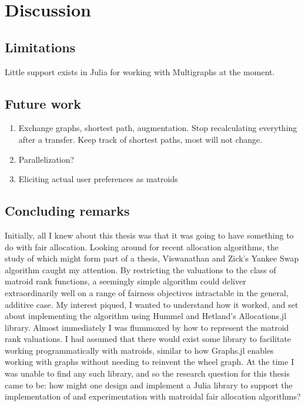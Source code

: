 \chapter{Discussion}
\label{chap:conclusions}
\skelpar

\section{Limitations}
Little support exists in Julia for working with Multigraphs at the moment.

\section{Future work}
\begin{enumerate}
  \item Exchange graphs, shortest path, augmentation. Stop recalculating everything after a transfer. Keep track of shortest paths, most will not change.
  \item Parallelization?
  \item Eliciting actual user preferences as matroids
\end{enumerate}

\section{Concluding remarks}
Initially, all I knew about this thesis was that it was going to have something to do with fair allocation. Looking around for recent allocation algorithms, the study of which might form part of a thesis, Viswanathan and Zick's Yankee Swap algorithm caught my attention. By restricting the valuations to the class of matroid rank functions, a seemingly simple algorithm could deliver extraordinarily well on a range of fairness objectives intractable in the general, additive case. My interest piqued, I wanted to understand how it worked, and set about implementing the algorithm using Hummel and Hetland's Allocations.jl library. Almost immediately I was flummoxed by how to represent the matroid rank valuations. I had assumed that there would exist some library to facilitate working programmatically with matroids, similar to how Graphs.jl enables working with graphs without needing to reinvent the wheel graph. At the time I was unable to find any such library, and so the research question for this thesis came to be: how might one design and implement a Julia library to support the implementation of and experimentation with matroidal fair allocation algorithms? 


